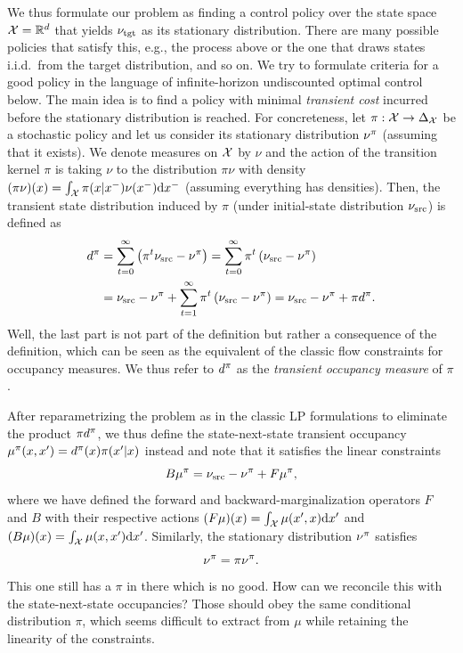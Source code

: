 \documentclass[twoside,10pt]{../jmlr}
\begin{document}
We thus formulate our problem as finding a control policy over the state space $\mathcal{X} = \mathbb{R}^d$ that yields $\nu_{\text{tgt}}$ as its 
stationary distribution. There are many possible policies that satisfy this, e.g., the process above or the one that 
draws states i.i.d.~from the target distribution, and so on. We try to formulate criteria for a good policy in the 
language of infinite-horizon undiscounted optimal control below. The main idea is to find a policy with minimal 
\emph{transient cost} incurred before the stationary distribution is reached. For concreteness, let $\pi:\mathcal{X} \rightarrow 
\Delta_{\mathcal{X}}$ be a stochastic policy and let us consider its stationary distribution $\nu^\pi$ (assuming that it exists). 
We denote measures on $\mathcal{X}$ by $\nu$ and the action of the transition kernel $\pi$ is taking $\nu$ to the distribution 
$\pi\nu$ with density $(\pi\nu)(x) = \int_{\mathcal{X}} \pi(x|x^-) \nu(x^-) \mathrm{d} x^-$ (assuming everything has densities). Then, 
the transient state distribution induced by $\pi$ (under initial-state distribution $\nu_{\text{src}}$) is defined as
\begin{align*}
 d^\pi &= \sum_{t=0}^\infty \left(\pi^t \nu_{\text{src}} - \nu^\pi\right) = \sum_{t=0}^\infty \pi^t \left(\nu_{\text{src}} - \nu^\pi\right)
 \\
 &= \nu_{\text{src}} - \nu^\pi + \sum_{t=1}^\infty \pi^t \left(\nu_{\text{src}} - \nu^\pi\right) = \nu_{\text{src}} - \nu^\pi + \pi d^\pi.
\end{align*}
Well, the last part is not part of the definition but rather a consequence of the definition, which can be seen as the 
equivalent of the classic flow constraints for occupancy measures. We thus refer to $d^\pi$ as the \emph{transient 
occupancy measure} of $\pi$.

After reparametrizing the problem as in the classic LP formulations to eliminate the product $\pi d^\pi$, we thus define 
the state-next-state transient occupancy $\mu^\pi(x,x')=d^\pi(x)\pi(x'|x)$ instead and note that it satisfies the linear 
constraints
\[
 B\mu^\pi = \nu_{\text{src}} - \nu^\pi + F\mu^\pi,
\]
where we have defined the forward and backward-marginalization operators $F$ and $B$ with their respective actions 
$(F\mu)(x) = \int_{\mathcal{X}} \mu(x',x) \mathrm{d} x'$ and $(B\mu)(x) = \int_{\mathcal{X}} \mu(x,x') \mathrm{d} x'$. Similarly, the 
stationary distribution $\nu^\pi$ satisfies
\[
 \nu^\pi = \pi \nu^\pi.
\]
This one still has a $\pi$ in there which is no good. How can we reconcile this with the state-next-state occupancies? 
Those should obey the same conditional distribution $\pi$, which seems difficult to extract from $\mu$ while retaining 
the linearity of the constraints.
\end{document}
